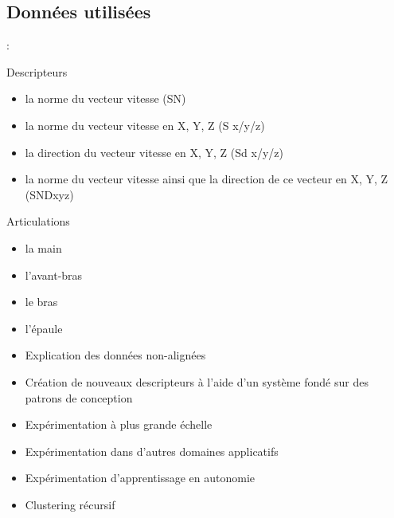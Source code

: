 \begin{frame}{\subsecname}
    \subsection{Données utilisées}  
    \begin{frame}{\secname : \subsecname}
        \begin{block}{Descripteurs}
            \begin{itemize}
                \item la norme du vecteur vitesse (SN)
                \item la norme du vecteur vitesse en X, Y, Z (S x/y/z)
                \item la direction du vecteur vitesse en X, Y, Z (Sd x/y/z)
                \item la norme du vecteur vitesse ainsi que la direction de ce vecteur en X, Y, Z (SNDxyz)
            \end{itemize}
        \end{block}
        
        \begin{block}{Articulations}
            \begin{itemize}
                \item la main
                \item l'avant-bras
                \item le bras
                \item l'épaule
            \end{itemize}
        \end{block}
    \end{frame}

    \begin{frame}{\secname}
        \begin{itemize}[label=$\bullet$]
            \item Explication des données non-alignées
            \item Création de nouveaux descripteurs à l'aide d'un système fondé sur des patrons de conception
            \item Expérimentation à plus grande échelle
            \item Expérimentation dans d'autres domaines applicatifs
            \item Expérimentation d'apprentissage en autonomie
            \item Clustering récursif
        \end{itemize}
    \end{frame}


\end{frame}

